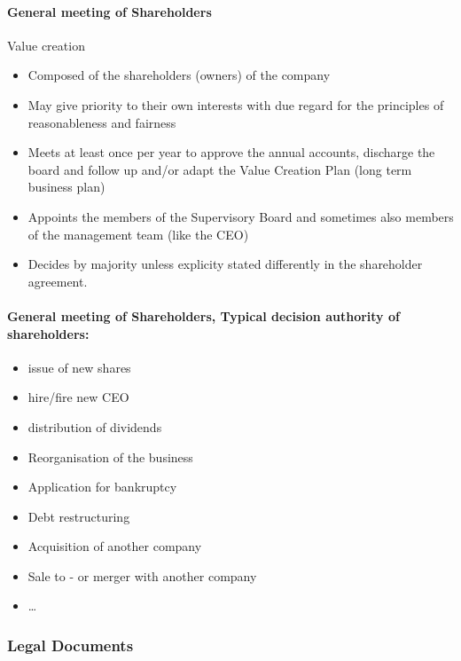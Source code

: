 \paragraph{General meeting of Shareholders} Value creation

\begin{itemize}
    \item Composed of the shareholders (owners) of the company
    \item May give priority to their own interests with due regard for the
        principles of reasonableness and fairness
    \item Meets at least once per year to approve the annual accounts,
        discharge the board and follow up and/or adapt the Value Creation
        Plan (long term business plan)
    \item Appoints the members of the Supervisory Board and sometimes also
        members of the management team (like the CEO)
    \item Decides by majority unless explicity stated differently in the
        shareholder agreement.
\end{itemize}

\paragraph{General meeting of Shareholders, Typical decision authority
of shareholders:}

\begin{itemize}
    \item issue of new shares
    \item hire/fire new CEO
    \item distribution of dividends
    \item Reorganisation of the business
    \item Application for bankruptcy
    \item Debt restructuring
    \item Acquisition of another company
    \item Sale to - or merger with another company
    \item \dots
\end{itemize}

\subsubsection{Legal Documents}

